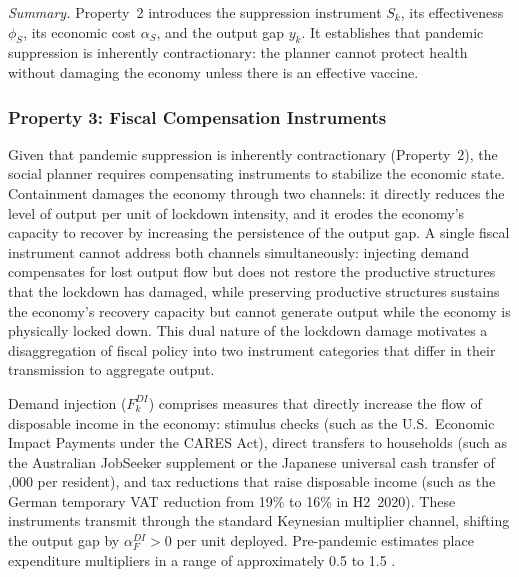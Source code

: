 \documentclass[12pt, a4paper]{article}
\newcommand{\Sk}{S_k}
\begin{document}
\medskip
\noindent\textit{Summary.} Property~2 introduces the suppression instrument $\Sk$, its effectiveness $\phi_S$, its economic cost $\alpha_S$, and the output gap $y_k$. It establishes that pandemic suppression is inherently contractionary: the planner cannot protect health without damaging the economy unless there is an effective vaccine.


\subsubsection*{Property 3: Fiscal Compensation Instruments}

Given that pandemic suppression is inherently contractionary (Property~2), the social planner requires compensating instruments to stabilize the economic state. Containment damages the economy through two channels: it directly reduces the level of output per unit of lockdown intensity, and it erodes the economy's capacity to recover by increasing the persistence of the output gap. A single fiscal instrument cannot address both channels simultaneously: injecting demand compensates for lost output flow but does not restore the productive structures that the lockdown has damaged, while preserving productive structures sustains the economy's recovery capacity but cannot generate output while the economy is physically locked down. This dual nature of the lockdown damage motivates a disaggregation of fiscal policy into two instrument categories that differ in their transmission to aggregate output.

Demand injection ($F^{DI}_k$) comprises measures that directly increase the flow of disposable income in the economy: stimulus checks (such as the U.S.\ Economic Impact Payments under the CARES Act), direct transfers to households (such as the Australian JobSeeker supplement or the Japanese universal cash transfer of ,000 per resident), and tax reductions that raise disposable income (such as the German temporary VAT reduction from 19\% to 16\% in H2~2020). These instruments transmit through the standard Keynesian multiplier channel, shifting the output gap by $\alpha^{DI}_F > 0$ per unit deployed. Pre-pandemic estimates place expenditure multipliers in a range of approximately 0.5 to 1.5 \citep{ramey2018, blanchard2002}.
\end{document}
